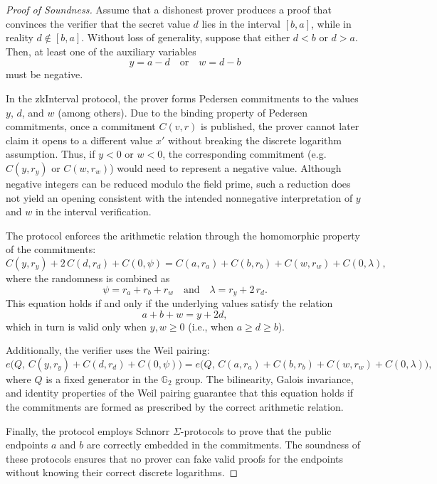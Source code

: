 \documentclass{iacrcc}
\theoremstyle{definition}
\begin{document}
\begin{proof}[Proof of Soundness]
  Assume that a dishonest prover produces a proof that convinces the verifier that the secret value \( d \) lies in the interval \([b, a]\), while in reality \( d \notin [b, a] \). Without loss of generality, suppose that either \( d < b \) or \( d > a \). Then, at least one of the auxiliary variables
  \[
  y = a - d \quad \text{or} \quad w = d - b
  \]
  must be negative.
  
  In the zkInterval protocol, the prover forms Pedersen commitments to the values \( y \), \( d \), and \( w \) (among others). Due to the binding property of Pedersen commitments, once a commitment \( C(v, r) \) is published, the prover cannot later claim it opens to a different value \( x' \) without breaking the discrete logarithm assumption. Thus, if \( y < 0 \) or \( w < 0 \), the corresponding commitment (e.g. \( C(y, r_y) \) or \( C(w, r_w) \)) would need to represent a negative value. Although negative integers can be reduced modulo the field prime, such a reduction does not yield an opening consistent with the intended nonnegative interpretation of \( y \) and \( w \) in the interval verification.
  
  The protocol enforces the arithmetic relation through the homomorphic property of the commitments:
  \[
  C(y, r_y) + 2\,C(d, r_d) + C(0, \psi) = C(a, r_a) + C(b, r_b) + C(w, r_w) + C(0, \lambda),
  \]
  where the randomness is combined as
  \[
  \psi = r_a + r_b + r_w \quad \text{and} \quad \lambda = r_y + 2\,r_d.
  \]
  This equation holds if and only if the underlying values satisfy the relation
  \[
  a + b + w = y + 2d,
  \]
  which in turn is valid only when \( y, w \geq 0 \) (i.e., when \( a \geq d \geq b \)).
  
  Additionally, the verifier uses the Weil pairing:
  \[
  e\Big(Q,\, C(y, r_y) + C(d, r_d) + C(0, \psi)\Big) = e\Big(Q,\, C(a, r_a) + C(b, r_b) + C(w, r_w) + C(0, \lambda)\Big),
  \]
  where \( Q \) is a fixed generator in the \( \mathbb{G}_{2} \) group. The bilinearity, Galois invariance, and identity properties of the Weil pairing guarantee that this equation holds if the commitments are formed as prescribed by the correct arithmetic relation.
  
  Finally, the protocol employs Schnorr \(\Sigma\)-protocols to prove that the public endpoints \( a \) and \( b \) are correctly embedded in the commitments. The soundness of these protocols ensures that no prover can fake valid proofs for the endpoints without knowing their correct discrete logarithms.
  

\end{proof}
\end{document}
